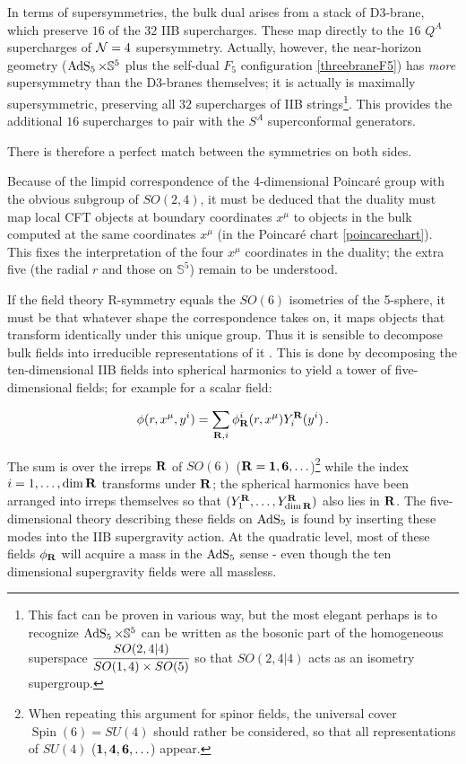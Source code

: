 In terms of supersymmetries, the bulk dual arises from a stack of D3-brane, which preserve $16$ of the $32$ IIB supercharges. These map directly to the $16$ $Q^A$ supercharges of $\mathcal{N} = 4$ supersymmetry. Actually, however, the near-horizon geometry ($\operatorname{AdS}_{5} \times \mathbb{S}^5$ plus the self-dual $F_5$ configuration \eqref{threebraneF5}) has \emph{more} supersymmetry than the D3-branes themselves; it is actually is maximally supersymmetric, preserving all $32$ supercharges of IIB strings\footnote{This fact can be proven in various way, but the most elegant perhaps is to recognize \cite{METSAEV} $\operatorname{AdS}_{5} \times \mathbb{S}^5$ can be written as the bosonic part of the homogeneous superspace $\cfrac{SO(2,4|4)}{SO(1,4)\times SO(5)}$ so that $SO(2,4|4)$ acts as an isometry supergroup.}. This provides the additional $16$ supercharges to pair with the $S^A$ superconformal generators.

There is therefore a perfect match between the symmetries on both sides.

Because of the limpid correspondence of the 4-dimensional Poincar\'e group with the obvious subgroup of $SO(2,4)$, it must be deduced that the duality must map local CFT objects at boundary coordinates $x^\mu$ to objects in the bulk computed at the same coordinates $x^\mu$ (in the Poincar\'e chart \eqref{poincarechart}). This fixes the interpretation of the four $x^\mu$ coordinates in the duality; the extra five (the radial $r$ and those on $\mathbb{S}^5$) remain to be understood.

If the field theory R-symmetry equals the $SO(6)$ isometries of the 5-sphere, it must be that whatever shape the correspondence takes on, it maps objects that transform identically under this unique group. Thus it is sensible to decompose bulk fields into irreducible representations of it \cite{Witten:adshol}. This is done by decomposing the ten-dimensional IIB fields into spherical harmonics to yield a tower of five-dimensional fields; for example for a scalar field:

\begin{equation}
	\phi(r,x^\mu,y^i) = \sum_{\mathbf{R},i}  \phi_{\mathbf{R}}^i(r,x^\mu) Y^{\mathbf{R}}_i (y^i)\,.
	\label{}
\end{equation}

The sum is over the irreps $\mathbf{R}$ of $SO(6)$ ($\mathbf{R} = \mathbf{1}, \mathbf{6}, \ldots$)\footnote{When repeating this argument for spinor fields, the universal cover $\operatorname{Spin}(6) = SU(4)$ should rather be considered, so that all representations of $SU(4)$ ($\mathbf{1}, \mathbf{4},\mathbf{6}, \ldots$) appear.} while the index $i = 1,\ldots,\dim \mathbf{R}$ transforms under $\mathbf{R}$; the spherical harmonics have been arranged into irreps themselves so that $(Y^{\mathbf{R}}_1, \ldots, Y^{\mathbf{R}}_{\dim \mathbf{R}} ) $ also lies in $\mathbf{R}$. The five-dimensional theory describing these fields on $\operatorname{AdS}_{5}$ is found by inserting these modes into the IIB supergravity action. At the quadratic level, most of these fields $\phi_{\mathbf{R}}$ will acquire a mass in the $\operatorname{AdS}_{5}$ sense - even though the ten dimensional supergravity fields were all massless.

